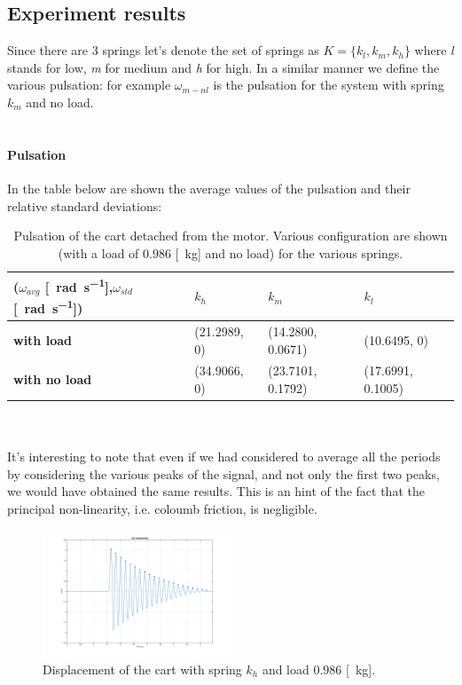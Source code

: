 \subsection{Experiment results}
Since there are $3$ springs let's denote the set of springs as $K=\{k_l, k_m, k_h\}$ where \emph{l} stands for low, \emph{m} for medium and \emph{h} for high. In a similar manner we define the various pulsation: for example $\omega_{m-nl}$ is the pulsation for the system with spring $k_m$ and no load.
\\ \\ 
\paragraph{Pulsation}
In the table below are shown the average values of the pulsation and their relative standard deviations:
\begin{table}[!h]
\centering

\label{table: cart_detached_omega}
\begin{tabular}{|l|l|l|l|}
\hline
{(\textbf{$\omega_{avg}$} [\SI{}{\radian \per \second}],$\omega_{std}$ [\SI{}{\radian \per \second}])} & \textbf{$k_h$} & \textbf{$k_m$}   & \textbf{$k_l$}   \\ \hline
\textbf{with load}         & (21.2989, 0)    & (14.2800, 0.0671) & (10.6495, 0)      \\ \hline
\textbf{with no load}      & (34.9066, 0)    & (23.7101, 0.1792) & (17.6991, 0.1005) \\ \hline
\end{tabular}
\caption{Pulsation of the cart detached from the motor. Various configuration are shown (with a load of $0.986$ [\SI{}{\kilo \gram}] and no load) for the various springs. }
\end{table} \\ \\
It's interesting to note that even if we  had considered to average all the periods by considering the various peaks of the signal, and not only the first two peaks, we would have obtained the same results. This is an hint of the fact that the principal non-linearity, i.e. coloumb friction, is negligible.

\begin{figure}[!ht]
    \centering
    \includegraphics[width=0.5\textwidth]{img/cart_detached_1.png}
    \caption{Displacement of the cart with spring $k_h$ and load $0.986$ [\SI{}{\kilo \gram}].}
    \label{fig:cart_detached_figure}
\end{figure}
